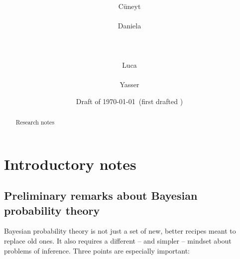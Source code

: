 \documentclass[\ifafour a4paper,12pt,\else a5paper,10pt,\fi%
onecolumn,oneside,article,%
british%
]{memoir}
\title{\propertitle%
}
\author{%
\hspace*{\stretch{1}}%
\parbox{0.5\linewidth}%
{\protect\centering C\"uneyt\\%
\footnotesize\epost{\email{cuneyt.guzey}{ntnu.no}}}%
\hspace*{\stretch{1}}%
\parbox{0.5\linewidth}%
{\protect\centering Daniela\\%
\footnotesize\epost{\email{daniela.bragantini}{ntnu.no}}}%
\hspace*{\stretch{1}}%
\\[\jot]\hspace*{\stretch{1}}%
\parbox{0.5\linewidth}%
{\protect\centering Luca\\%
\footnotesize\epost{\email{piero.mana}{ntnu.no}}}%
\hspace*{\stretch{1}}%
\parbox{0.5\linewidth}%
{\protect\centering Yasser\\%
\footnotesize\epost{\email{yasser.roudi}{ntnu.no}}}%
\hspace*{\stretch{1}}%
}
\date{Draft of \today\ (first drafted \firstdraft)}
\theoremstyle{remark}
\theoremstyle{innote}
\newcommand*{\asudedication}[1]{%
{\par\centering\textit{#1}\par}}
\renewcommand*{\|}{\mathpunct{|}}
\begin{document}
\captiondelim{\quad}\captionnamefont{\footnotesize}\captiontitlefont{\footnotesize}
\frenchspacing

\maketitle
\ifpublic
\abstractrunin
\abslabeldelim{}
\renewcommand*{\abstractname}{}
\setlength{\absleftindent}{0pt}
\setlength{\absrightindent}{0pt}
\setlength{\abstitleskip}{-\absparindent}
\begin{abstract}%
  \noindent Research notes
\end{abstract}\fi

\frenchspacing

\section{Introductory notes}
\label{sec:intro}



\subsection{Preliminary remarks about Bayesian probability theory}
\label{sec:prelim_remarks}

Bayesian probability theory is not just a set of new, better recipes meant
to replace old ones. It also requires a different -- and simpler -- mindset
about problems of inference. Three points are especially important:
\end{document}
